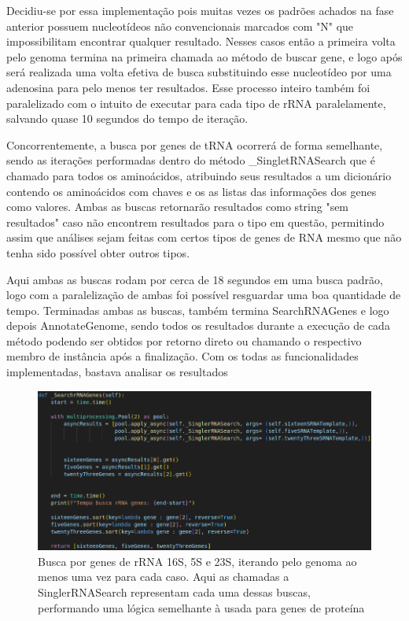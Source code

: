 \documentclass[brazilian,12pt,a4paper,final]{article}
\begin{document}
\vspace{0.5cm}

 Decidiu-se por essa implementação pois muitas vezes os padrões achados na fase anterior possuem nucleotídeos não convencionais marcados com "N" que impossibilitam encontrar qualquer resultado. Nesses casos então a primeira volta pelo genoma termina na primeira chamada ao método de buscar gene, e logo após será realizada uma volta efetiva de busca substituindo esse nucleotídeo por uma adenosina para pelo menos ter resultados. Esse processo inteiro também foi paralelizado com o intuito de executar para cada tipo de rRNA paralelamente, salvando quase 10 segundos do tempo de iteração.
 
 \vspace{0.5cm}
 
 Concorrentemente, a busca por genes de tRNA ocorrerá de forma semelhante, sendo as iterações performadas dentro do método \_SingletRNASearch que é chamado para todos os aminoácidos, atribuindo seus resultados a um dicionário contendo os aminoácidos com chaves e os as listas das informações dos genes como valores. Ambas as buscas retornarão resultados como string "sem resultados" caso não encontrem resultados para o tipo em questão, permitindo assim que análises sejam feitas com certos tipos de genes de RNA mesmo que não tenha sido possível obter outros tipos.
 
 \vspace{0.5cm}
 
 Aqui ambas as buscas rodam por cerca de 18 segundos em uma busca padrão, logo com a paralelização de ambas foi possível resguardar uma boa quantidade de tempo. Terminadas ambas as buscas, também termina SearchRNAGenes e logo depois AnnotateGenome, sendo todos os resultados durante a execução de cada método podendo ser obtidos por retorno direto ou chamando o respectivo membro de instância após a finalização.
 Com os todas as funcionalidades implementadas, bastava analisar os resultados


\begin{figure}[hbtp]
	\begin{center}
		\includegraphics[width=15cm]{../Figures/SearchrRNAGenes.png}
		\caption{Busca por genes de rRNA 16S, 5S e 23S, iterando pelo genoma ao menos uma vez para cada caso. Aqui as chamadas a SinglerRNASearch representam cada uma dessas buscas, performando uma lógica semelhante à usada para genes de proteína}
		\label{fig}
	\end{center}
\end{figure}
\end{document}

